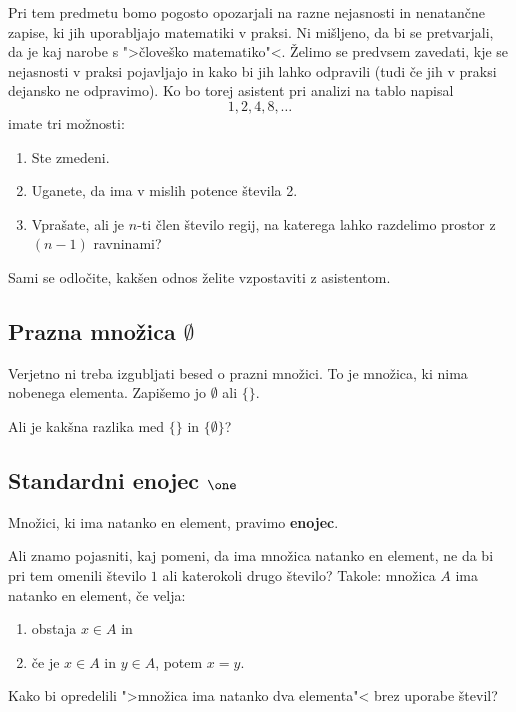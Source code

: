 Pri tem predmetu bomo pogosto opozarjali na razne nejasnosti in nenatančne zapise, ki jih uporabljajo matematiki v praksi.
Ni mišljeno, da bi se pretvarjali, da je kaj narobe s ">človeško matematiko"<. Želimo se predvsem zavedati, kje se nejasnosti v praksi pojavljajo in kako bi jih lahko odpravili (tudi če jih v praksi dejansko ne odpravimo). Ko bo torej asistent pri analizi na tablo napisal
%
\begin{equation*}
    1, 2, 4, 8, \ldots
\end{equation*}
imate tri možnosti:
%
\begin{enumerate}
  \item Ste zmedeni.
  \item Uganete, da ima v mislih potence števila 2.
  \item Vprašate, ali je $n$-ti člen število regij, na katerega lahko razdelimo prostor z $(n-1)$ ravninami?
\end{enumerate}
%
Sami se odločite, kakšen odnos želite vzpostaviti z asistentom.

\subsection{Prazna množica $\emptyset$}

Verjetno ni treba izgubljati besed o prazni množici. To je množica, ki nima nobenega elementa. Zapišemo jo $\emptyset$ ali $\{\}$.

\begin{naloga}
  Ali je kakšna razlika med $\{\}$ in $\{\emptyset\}$?
\end{naloga}


\subsection{Standardni enojec $\one$}

Množici, ki ima natanko en element, pravimo \textbf{enojec}.

Ali znamo pojasniti, kaj pomeni, da ima množica natanko en element, ne da bi pri tem omenili število $1$ ali katerokoli drugo število? Takole: množica $A$ ima natanko en element, če velja:
%
\begin{enumerate}
\item obstaja $x \in A$ in
\item če je $x \in A$ in $y \in A$, potem $x = y$.
\end{enumerate}

\begin{naloga}
  Kako bi opredelili ">množica ima natanko dva elementa"< brez uporabe števil?
\end{naloga}

